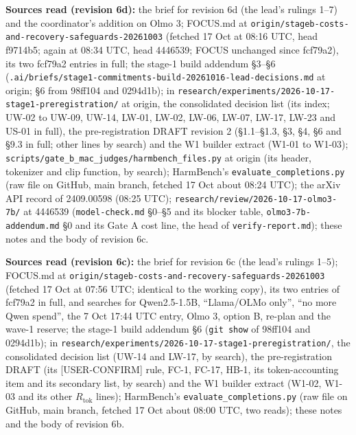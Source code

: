 \documentclass{article}
\theoremstyle{plain}
\theoremstyle{definition}
\theoremstyle{remark}
\begin{document}
\textbf{Sources read (revision 6d):} the brief for revision 6d (the lead's
rulings 1--7) and the coordinator's addition on Olmo 3; FOCUS.md at
\nolinkurl{origin/stageb-costs-and-recovery-safeguards-20261003} (fetched 17 Oct
at 08:16 UTC, head f9714b5; again at 08:34 UTC, head 4446539; FOCUS unchanged
since fcf79a2), its two fcf79a2 entries in full; the stage-1 build addendum
\S{}3--\S{}6
(\nolinkurl{.ai/briefs/stage1-commitments-build-20261016-lead-decisions.md} at
origin; \S{}6 from 98ff104 and 0294d1b); in
\nolinkurl{research/experiments/2026-10-17-stage1-preregistration/} at origin,
the consolidated decision list (its index; UW-02 to UW-09, UW-14, LW-01, LW-02,
LW-06, LW-07, LW-17, LW-23 and US-01 in full), the pre-registration DRAFT
revision 2 (\S{}1.1--\S{}1.3, \S{}3, \S{}4, \S{}6 and \S{}9.3 in full; other
lines by search) and the W1 builder extract (W1-01 to W1-03);
\nolinkurl{scripts/gate_b_mac_judges/harmbench_files.py} at origin (its header,
tokenizer and clip function, by search); HarmBench's
\nolinkurl{evaluate_completions.py} (raw file on GitHub, main branch, fetched 17
Oct about 08:24 UTC); the arXiv API record of 2409.00598 (08:25 UTC);
\nolinkurl{research/review/2026-10-17-olmo3-7b/} at 4446539
(\nolinkurl{model-check.md} \S{}0--\S{}5 and its blocker table,
\nolinkurl{olmo3-7b-addendum.md} \S{}0 and its Gate A cost line, the head of
\nolinkurl{verify-report.md}); these notes and the body of revision 6c.

\textbf{Sources read (revision 6c):} the brief for revision 6c (the lead's
rulings 1--5); FOCUS.md at
\nolinkurl{origin/stageb-costs-and-recovery-safeguards-20261003} (fetched 17 Oct
at 07:56 UTC; identical to the working copy), its two entries of fcf79a2 in
full, and searches for Qwen2.5-1.5B, ``Llama/OLMo only'', ``no more Qwen
spend'', the 7 Oct 17:44 UTC entry, Olmo 3, option B, re-plan and the wave-1
reserve; the stage-1 build addendum \S{}6 (\texttt{git show} of 98ff104 and
0294d1b); in
\nolinkurl{research/experiments/2026-10-17-stage1-preregistration/}, the
consolidated decision list (UW-14 and LW-17, by search), the pre-registration
DRAFT (its [USER-CONFIRM] rule, FC-1, FC-17, HB-1, its token-accounting item and
its secondary list, by search) and the W1 builder extract (W1-02, W1-03 and its
other $R_{\mathrm{tok}}$ lines); HarmBench's \nolinkurl{evaluate_completions.py}
(raw file on GitHub, main branch, fetched 17 Oct about 08:00 UTC, two reads);
these notes and the body of revision 6b.
\end{document}

